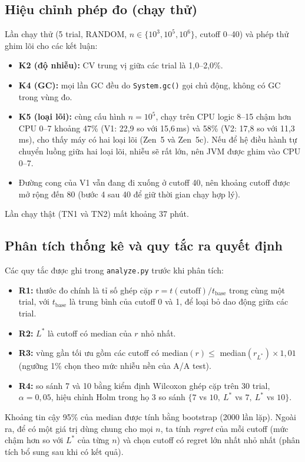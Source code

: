 \documentclass[11pt,a4paper]{article}
\begin{document}
\subsection{Hiệu chỉnh phép đo (chạy thử)}
Lần chạy thử (5 trial, RANDOM, $n \in \{10^3, 10^5, 10^6\}$, cutoff 0--40) và phép thử ghim lõi cho các kết luận:
\begin{itemize}
\item \textbf{K2 (độ nhiễu):} CV trung vị giữa các trial là 1,0--2,0\%.
\item \textbf{K4 (GC):} mọi lần GC đều do \texttt{System.gc()} gọi chủ động, không có GC trong vùng đo.
\item \textbf{K5 (loại lõi):} cùng cấu hình $n=10^5$, chạy trên CPU logic 8--15 chậm hơn CPU 0--7 khoảng 47\%
  (V1: 22,9 so với 15,6\,ms) và 58\% (V2: 17,8 so với 11,3\,ms), cho thấy máy có hai loại lõi
  (Zen~5 và Zen~5c). Nếu để hệ điều hành tự chuyển luồng giữa hai loại lõi, nhiễu sẽ rất lớn,
  nên JVM được ghim vào CPU 0--7.
\item Đường cong của V1 vẫn đang đi xuống ở cutoff 40, nên khoảng cutoff được mở rộng đến 80
  (bước 4 sau 40 để giữ thời gian chạy hợp lý).
\end{itemize}
Lần chạy thật (TN1 và TN2) mất khoảng 37 phút.

\subsection{Phân tích thống kê và quy tắc ra quyết định}
Các quy tắc được ghi trong \texttt{analyze.py} trước khi phân tích:
\begin{itemize}
\item \textbf{R1:} thước đo chính là tỉ số ghép cặp $r = t(\text{cutoff}) / t_{\text{base}}$ trong cùng một trial,
  với $t_{\text{base}}$ là trung bình của cutoff 0 và 1, để loại bỏ dao động giữa các trial.
\item \textbf{R2:} $L^*$ là cutoff có median của $r$ nhỏ nhất.
\item \textbf{R3:} vùng gần tối ưu gồm các cutoff có median$(r) \le$ median$(r_{L^*}) \times 1{,}01$
  (ngưỡng 1\% chọn theo mức nhiễu nền của A/A test).
\item \textbf{R4:} so sánh 7 và 10 bằng kiểm định Wilcoxon ghép cặp \citep{wilcoxon} trên 30 trial, $\alpha=0{,}05$,
  hiệu chỉnh Holm \citep{holm} trong họ 3 so sánh $\{7$ vs $10,\ L^*$ vs $7,\ L^*$ vs $10\}$.
\end{itemize}
Khoảng tin cậy 95\% của median được tính bằng bootstrap (2000 lần lặp).
Ngoài ra, để có một giá trị dùng chung cho mọi $n$, ta tính \emph{regret} của mỗi cutoff
(mức chậm hơn so với $L^*$ của từng $n$) và chọn cutoff có regret lớn nhất nhỏ nhất (phân tích bổ sung sau khi có kết quả).
\end{document}
